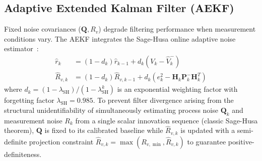 \documentclass[balance,nocopyright,upint,varvw,hyphenate,barcolor=NavyBlue,nolists]{asmejour}
\begin{document}
\subsection{Adaptive Extended Kalman Filter (AEKF)}
Fixed noise covariances ($\mathbf{Q}, R_v$) degrade filtering performance when measurement conditions vary. The AEKF integrates the Sage-Husa online adaptive noise estimator~\cite{Han2019aekf}:
\begin{align}
\hat{r}_k &= (1 - d_k)\hat{r}_{k-1} + d_k \left( V_k - \hat{V}_k^- \right) \label{eqn:sh_mean}\\
\hat{R}_{v,k} &= (1 - d_k)\hat{R}_{v,k-1} + d_k \left( e_k^2 - \mathbf{H}_k \mathbf{P}_k^- \mathbf{H}_k^T \right) \label{eqn:sh_meas_cov}
\end{align}
where $d_k = (1 - \lambda_{\text{SH}}) / (1 - \lambda_{\text{SH}}^{k})$ is an exponential weighting factor with forgetting factor $\lambda_{\text{SH}} = 0.985$. To prevent filter divergence arising from the structural unidentifiability of simultaneously estimating process noise $\mathbf{Q}_k$ and measurement noise $R_k$ from a single scalar innovation sequence (classic Sage-Husa theorem), $\mathbf{Q}$ is fixed to its calibrated baseline while $\hat{R}_{v,k}$ is updated with a semi-definite projection constraint $\hat{R}_{v,k} = \max(R_{v,\min}, \hat{R}_{v,k})$ to guarantee positive-definiteness.
\end{document}
